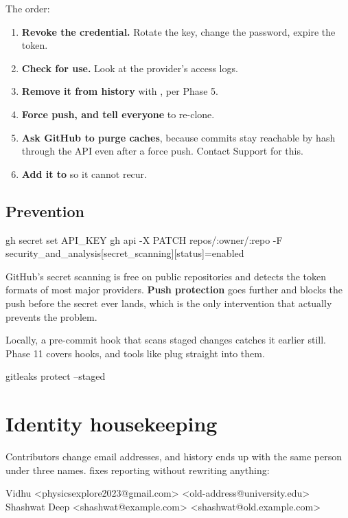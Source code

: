 \documentclass[11pt]{article}
\begin{document}
The order:

\begin{enumerate}
  \item \textbf{Revoke the credential.} Rotate the key, change the password, expire
    the token.
  \item \textbf{Check for use.} Look at the provider's access logs.
  \item \textbf{Remove it from history} with , per Phase 5.
  \item \textbf{Force push, and tell everyone} to re-clone.
  \item \textbf{Ask GitHub to purge caches}, because commits stay reachable by hash
    through the API even after a force push. Contact Support for this.
  \item \textbf{Add it to } so it cannot recur.
\end{enumerate}

\subsection{Prevention}

\begin{shell}
gh secret set API_KEY
gh api -X PATCH repos/:owner/:repo -F security_and_analysis[secret_scanning][status]=enabled
\end{shell}

GitHub's secret scanning is free on public repositories and detects the token
formats of most major providers. \textbf{Push protection} goes further and blocks
the push before the secret ever lands, which is the only intervention that actually
prevents the problem.

Locally, a pre-commit hook that scans staged changes catches it earlier still. Phase
11 covers hooks, and tools like  plug straight into them.

\begin{shell}
gitleaks protect --staged
\end{shell}

\section{Identity housekeeping}

Contributors change email addresses, and history ends up with the same person under
three names.  fixes reporting without rewriting anything:

\begin{terminal}
Vidhu <physicsexplore2023@gmail.com> <old-address@university.edu>
Shashwat Deep <shashwat@example.com> <shashwat@old.example.com>
\end{terminal}
\end{document}
